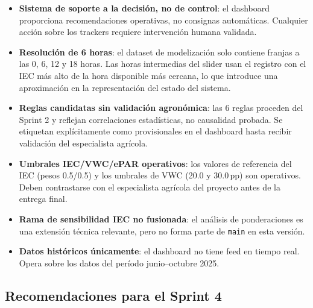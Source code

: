 \documentclass[11pt,a4paper]{article}
\begin{document}
\begin{itemize}
  \item \textbf{Sistema de soporte a la decisión, no de control}: el dashboard proporciona
    recomendaciones operativas, no consignas automáticas. Cualquier acción sobre los trackers
    requiere intervención humana validada.
  \item \textbf{Resolución de 6 horas}: el dataset de modelización solo contiene franjas a las
    0, 6, 12 y 18 horas. Las horas intermedias del slider usan el registro con el IEC más
    alto de la hora disponible más cercana, lo que introduce una aproximación en la representación
    del estado del sistema.
  \item \textbf{Reglas candidatas sin validación agronómica}: las 6 reglas proceden del Sprint 2
    y reflejan correlaciones estadísticas, no causalidad probada. Se etiquetan explícitamente
    como provisionales en el dashboard hasta recibir validación del especialista agrícola.
  \item \textbf{Umbrales IEC/VWC/ePAR operativos}: los valores de referencia del IEC (pesos
    0.5/0.5) y los umbrales de VWC (20.0 y 30.0\,pp) son operativos. Deben contrastarse
    con el especialista agrícola del proyecto antes de la entrega final.
  \item \textbf{Rama de sensibilidad IEC no fusionada}: el análisis de ponderaciones es una
    extensión técnica relevante, pero no forma parte de \texttt{main} en esta versión.
  \item \textbf{Datos históricos únicamente}: el dashboard no tiene feed en tiempo real. Opera
    sobre los datos del período junio–octubre 2025.
\end{itemize}

\subsection{Recomendaciones para el Sprint 4}
\end{document}
